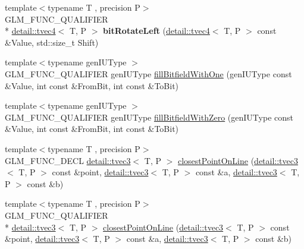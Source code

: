 \begin{DoxyCompactItemize}
\item 
\hypertarget{namespaceglm_a45a6d5d1c93e455dfdfc8fee6567ab92}{{\footnotesize template$<$typename T , precision P$>$ }\\G\-L\-M\-\_\-\-F\-U\-N\-C\-\_\-\-Q\-U\-A\-L\-I\-F\-I\-E\-R \\*
\hyperlink{structglm_1_1detail_1_1tvec4}{detail\-::tvec4}$<$ T, P $>$ {\bfseries bit\-Rotate\-Left} (\hyperlink{structglm_1_1detail_1_1tvec4}{detail\-::tvec4}$<$ T, P $>$ const \&Value, std\-::size\-\_\-t Shift)}\label{namespaceglm_a45a6d5d1c93e455dfdfc8fee6567ab92}

\item 
{\footnotesize template$<$typename gen\-I\-U\-Type $>$ }\\G\-L\-M\-\_\-\-F\-U\-N\-C\-\_\-\-Q\-U\-A\-L\-I\-F\-I\-E\-R gen\-I\-U\-Type \hyperlink{group__gtx__bit_gafac2a9e0ef0d5d2fc4e569bff2b2f452}{fill\-Bitfield\-With\-One} (gen\-I\-U\-Type const \&Value, int const \&From\-Bit, int const \&To\-Bit)
\item 
{\footnotesize template$<$typename gen\-I\-U\-Type $>$ }\\G\-L\-M\-\_\-\-F\-U\-N\-C\-\_\-\-Q\-U\-A\-L\-I\-F\-I\-E\-R gen\-I\-U\-Type \hyperlink{group__gtx__bit_ga0c514d45387003260783ba6a8a4f3285}{fill\-Bitfield\-With\-Zero} (gen\-I\-U\-Type const \&Value, int const \&From\-Bit, int const \&To\-Bit)
\item 
{\footnotesize template$<$typename T , precision P$>$ }\\G\-L\-M\-\_\-\-F\-U\-N\-C\-\_\-\-D\-E\-C\-L \hyperlink{structglm_1_1detail_1_1tvec3}{detail\-::tvec3}$<$ T, P $>$ \hyperlink{group__gtx__closest__point_ga03a6d7e93590f5d45050f6dc7aa8bf8f}{closest\-Point\-On\-Line} (\hyperlink{structglm_1_1detail_1_1tvec3}{detail\-::tvec3}$<$ T, P $>$ const \&point, \hyperlink{structglm_1_1detail_1_1tvec3}{detail\-::tvec3}$<$ T, P $>$ const \&a, \hyperlink{structglm_1_1detail_1_1tvec3}{detail\-::tvec3}$<$ T, P $>$ const \&b)
\item 
{\footnotesize template$<$typename T , precision P$>$ }\\G\-L\-M\-\_\-\-F\-U\-N\-C\-\_\-\-Q\-U\-A\-L\-I\-F\-I\-E\-R \\*
\hyperlink{structglm_1_1detail_1_1tvec3}{detail\-::tvec3}$<$ T, P $>$ \hyperlink{group__gtx__closest__point_ga03a6d7e93590f5d45050f6dc7aa8bf8f}{closest\-Point\-On\-Line} (\hyperlink{structglm_1_1detail_1_1tvec3}{detail\-::tvec3}$<$ T, P $>$ const \&point, \hyperlink{structglm_1_1detail_1_1tvec3}{detail\-::tvec3}$<$ T, P $>$ const \&a, \hyperlink{structglm_1_1detail_1_1tvec3}{detail\-::tvec3}$<$ T, P $>$ const \&b)

\end{DoxyCompactItemize}
